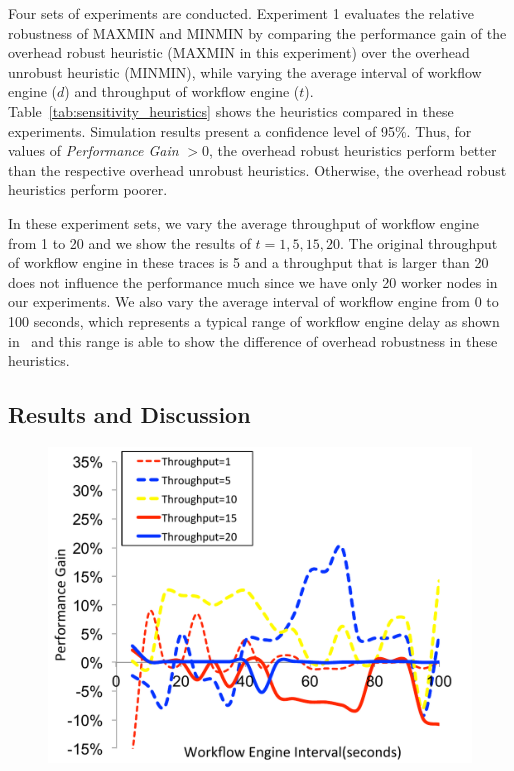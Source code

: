 Four sets of experiments are conducted. Experiment 1 evaluates the relative robustness of MAXMIN and MINMIN by comparing the performance gain of the overhead robust heuristic (MAXMIN in this experiment) over the overhead unrobust heuristic (MINMIN), while varying the average interval of workflow engine ($d$) and throughput of workflow engine ($t$). Table~\ref{tab:sensitivity_heuristics} shows the heuristics compared in these experiments. Simulation results present a confidence level of 95\%. Thus, for values of \emph{Performance Gain} $> 0$, the overhead robust heuristics perform better than the respective overhead unrobust heuristics. Otherwise, the overhead robust heuristics perform poorer.




In these experiment sets, we vary the average throughput of workflow engine from 1 to 20 and we show the results of $t=1, 5, 15, 20$. The original throughput of workflow engine in these traces is 5 and a throughput that is larger than 20 does not influence the performance much since we have only 20 worker nodes in our experiments. We also vary the average interval of workflow engine from 0 to 100 seconds, which represents a typical range of workflow engine delay as shown in~\cite{Chen2011} and this range is able to show the difference of overhead robustness in these heuristics. 

\subsection{Results and Discussion}

\begin{figure}[!htb]
\centering
 \includegraphics[width=0.9\linewidth]{figure/MAX-MIN-Broadband.pdf}
  \label{fig:MAX-MIN-Broadband}
\end{figure}

